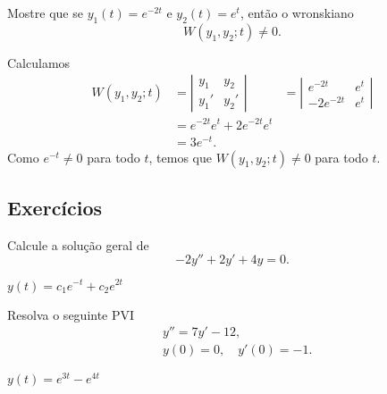 \begin{exeresol}
  Mostre que se $y_1(t) = e^{-2t}$ e $y_2(t) = e^t$, então o wronskiano
  \begin{equation}
    W(y_1,y_2; t) \neq 0.
  \end{equation}
\end{exeresol}
\begin{resol}
  Calculamos
  \begin{align}
    W(y_1,y_2; t) &= \left|
                    \begin{matrix}
                      y_1 & y_2 \\
                      y_1' & y_2'
                    \end{matrix}
                             \right|
                          &= \left|
                            \begin{matrix}
                              e^{-2t} & e^t \\
                              -2e^{-2t} & e^{t}
                            \end{matrix} \right| \\
                  &= e^{-2t}e^t + 2e^{-2t}e^t \\
                  &= 3e^{-t}.
  \end{align}
  Como $e^{-t} \neq 0$ para todo $t$, temos que $W(y_1,y_2; t)\neq 0$ para todo $t$.
\end{resol}

\subsection*{Exercícios}

\begin{exer}
  Calcule a solução geral de
  \begin{equation}
    -2y'' + 2y' + 4y = 0.
  \end{equation}
\end{exer}
\begin{resp}
  $y(t) = c_1e^{-t} + c_2e^{2t}$
\end{resp}

\begin{exer}
  Resolva o seguinte PVI
  \begin{align}
    &y'' = 7y' - 12,\\
    &y(0) = 0,\quad y'(0) = -1.
  \end{align}
\end{exer}
\begin{resp}
  $y(t) = e^{3t} - e^{4t}$
\end{resp}

